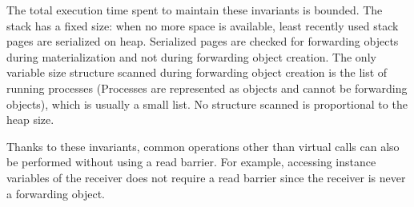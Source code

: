 \documentclass[sigplan,10pt,review,anonymous]{acmart}\settopmatter{printfolios=true,printccs=false,printacmref=false}
\begin{document}
The total execution time spent to maintain these invariants is bounded. The stack has a fixed size: when no more space is available, least recently used stack pages are serialized on heap. Serialized pages are checked for forwarding objects during materialization and not during forwarding object creation. The only variable size structure scanned during forwarding object creation is the list of running processes (Processes are represented as objects and cannot be forwarding objects), which is usually a small list. No structure scanned is proportional to the heap size.

% 
%
%
Thanks to these invariants, common operations other than virtual calls can also be performed without using a read barrier. For example, accessing instance variables of the receiver does not require a read barrier since the receiver is never a forwarding object.

\end{document}
